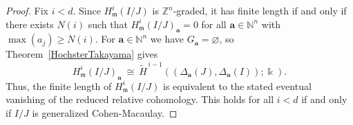 \documentclass[12pt]{amsart}
\numberwithin{equation}{section}
\newtheorem{theorem}{Theorem}[section]
\theoremstyle{definition}
\theoremstyle{definition}
\newcommand{\ZZ}{{\mathbb Z}}
\newcommand{\NN}{{\mathbb N}}
\def\kk{{\Bbbk}}
\def\mm{{\mathfrak m}}
\begin{document}
\begin{proof}
	Fix $i<d$. Since $H^i_{\mm}(I/J)$ is $\ZZ^n$-graded, it has finite length if and only if
	there exists $N(i)$ such that $H^i_{\mm}(I/J)_{\mathbf a}=0$ for all $\mathbf{a} \in\NN^n$
	with $\max(a_j)\ge N(i)$.
	For $\mathbf a\in\NN^n$ we have $G_{\mathbf a}=\varnothing$, so Theorem~\ref{HochsterTakayama} gives
	\[
	H^i_{\mm}(I/J)_{\mathbf a}\ \cong\ 
	\widetilde H^{\,i-1}\!\left((\Delta_{\mathbf a}(J),\Delta_{\mathbf a}(I));\kk\right).
	\]
	Thus, the finite length of $H^i_{\mm}(I/J)$ is equivalent to the stated eventual vanishing of
	the reduced relative cohomology. This holds for all $i<d$ if and only if $I/J$ is
	generalized Cohen-Macaulay.
\end{proof}

\medskip


%

\end{document}
